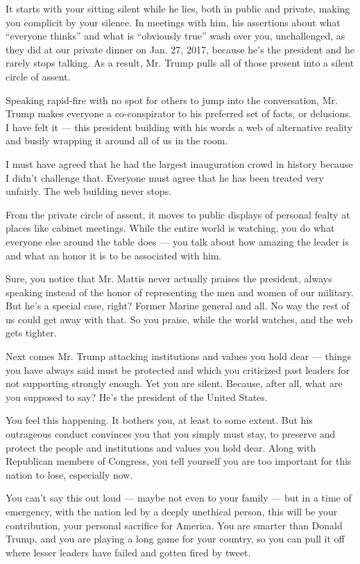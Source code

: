It starts with your sitting silent while he lies, both in public and
private, making you complicit by your silence. In meetings with him, his
assertions about what ``everyone thinks'' and what is ``obviously true''
wash over you, unchallenged, as they did at our private dinner on Jan.
27, 2017, because he's the president and he rarely stops talking. As a
result, Mr. Trump pulls all of those present into a silent circle of
assent.

Speaking rapid-fire with no spot for others to jump into the
conversation, Mr. Trump makes everyone a co-conspirator to his preferred
set of facts, or delusions. I have felt it --- this president building
with his words a web of alternative reality and busily wrapping it
around all of us in the room.

I must have agreed that he had the largest inauguration crowd in history
because I didn't challenge that. Everyone must agree that he has been
treated very unfairly. The web building never stops.

From the private circle of assent, it moves to public displays of
personal fealty at places like cabinet meetings. While the entire world
is watching, you do what everyone else around the table does --- you
talk about how amazing the leader is and what an honor it is to be
associated with him.

Sure, you notice that Mr. Mattis never actually praises the president,
always speaking instead of the honor of representing the men and women
of our military. But he's a special case, right? Former Marine general
and all. No way the rest of us could get away with that. So you praise,
while the world watches, and the web gets tighter.

Next comes Mr. Trump attacking institutions and values you hold dear ---
things you have always said must be protected and which you criticized
past leaders for not supporting strongly enough. Yet you are silent.
Because, after all, what are you supposed to say? He's the president of
the United States.

You feel this happening. It bothers you, at least to some extent. But
his outrageous conduct convinces you that you simply must stay, to
preserve and protect the people and institutions and values you hold
dear. Along with Republican members of Congress, you tell yourself you
are too important for this nation to lose, especially now.

You can't say this out loud --- maybe not even to your family --- but in
a time of emergency, with the nation led by a deeply unethical person,
this will be your contribution, your personal sacrifice for America. You
are smarter than Donald Trump, and you are playing a long game for your
country, so you can pull it off where lesser leaders have failed and
gotten fired by tweet.

